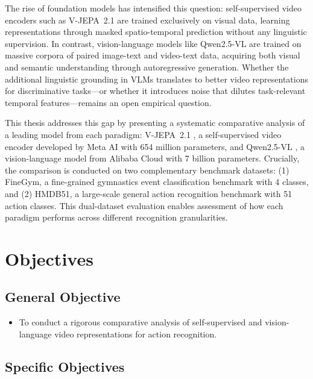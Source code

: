 The rise of foundation models has intensified this question: self-supervised video encoders such as V-JEPA~2.1 \citep{assran2025vjepa2, murlabadia2026vjepa21} are trained exclusively on visual data, learning representations through masked spatio-temporal prediction without any linguistic supervision. In contrast, vision-language models like Qwen2.5-VL \citep{bai2025qwen2vl} are trained on massive corpora of paired image-text and video-text data, acquiring both visual and semantic understanding through autoregressive generation. Whether the additional linguistic grounding in VLMs translates to better video representations for discriminative tasks---or whether it introduces noise that dilutes task-relevant temporal features---remains an open empirical question.

This thesis addresses this gap by presenting a systematic comparative analysis of a leading model from each paradigm: V-JEPA~2.1 \citep{assran2025vjepa2, murlabadia2026vjepa21}, a self-supervised video encoder developed by Meta AI with 654 million parameters, and Qwen2.5-VL \citep{bai2025qwen2vl}, a vision-language model from Alibaba Cloud with 7 billion parameters. Crucially, the comparison is conducted on two complementary benchmark datasets: (1) FineGym, a fine-grained gymnastics event classification benchmark with 4 classes, and (2) HMDB51, a large-scale general action recognition benchmark with 51 action classes. This dual-dataset evaluation enables assessment of how each paradigm performs across different recognition granularities.

\section{Objectives}

\subsection{General Objective}

\begin{itemize}
    \item To conduct a rigorous comparative analysis of self-supervised and vision-language video representations for action recognition.
\end{itemize}

\subsection{Specific Objectives}

